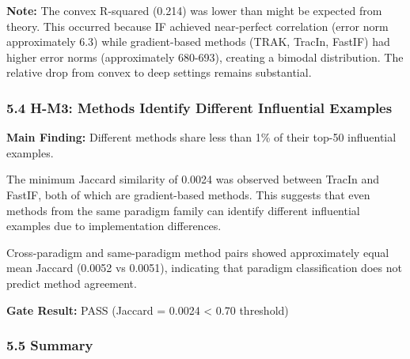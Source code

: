 \textbf{Note:} The convex R-squared (0.214) was lower than might be expected from theory. This occurred because IF achieved near-perfect correlation (error norm approximately 6.3) while gradient-based methods (TRAK, TracIn, FastIF) had higher error norms (approximately 680-693), creating a bimodal distribution. The relative drop from convex to deep settings remains substantial.

\subsubsection{5.4 H-M3: Methods Identify Different Influential Examples}

\textbf{Main Finding:} Different methods share less than 1\% of their top-50 influential examples.

\begin{table}[htbp]
\centering
{}
\end{table}

The minimum Jaccard similarity of 0.0024 was observed between TracIn and FastIF, both of which are gradient-based methods. This suggests that even methods from the same paradigm family can identify different influential examples due to implementation differences.

Cross-paradigm and same-paradigm method pairs showed approximately equal mean Jaccard (0.0052 vs 0.0051), indicating that paradigm classification does not predict method agreement.

\textbf{Gate Result:} PASS (Jaccard = 0.0024 < 0.70 threshold)

\subsubsection{5.5 Summary}

\begin{table}[htbp]
\centering
{}
\end{table}
